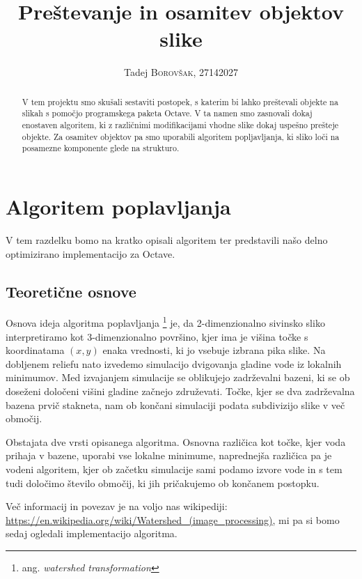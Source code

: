 \documentclass[a4paper, 11pt]{article}
\title{\huge{\textbf{Preštevanje in osamitev objektov slike}}}
\author{Tadej \textsc{Borovšak}, 27142027}
\begin{document}
\maketitle

\begin{abstract}
V tem projektu smo skušali sestaviti postopek, s katerim bi lahko preštevali objekte na slikah s pomočjo programskega paketa Octave. V ta namen smo zasnovali dokaj enostaven algoritem, ki z različnimi modifikacijami vhodne slike dokaj uspešno prešteje objekte. Za osamitev objektov pa smo uporabili algoritem popljavljanja, ki sliko loči na posamezne komponente glede na strukturo.
\end{abstract}

\tableofcontents


\section{Algoritem poplavljanja}

V tem razdelku bomo na kratko opisali algoritem ter predstavili našo delno optimizirano implementacijo za Octave.


\subsection{Teoretične osnove}

Osnova ideja algoritma poplavljanja \footnote{ang. \emph{watershed transformation}} je, da 2-dimenzionalno sivinsko sliko interpretiramo kot 3-dimenzionalno površino, kjer ima je višina točke s koordinatama $(x, y)$ enaka vrednosti, ki jo vsebuje izbrana pika slike. Na dobljenem reliefu nato izvedemo simulacijo dvigovanja gladine vode iz lokalnih minimumov. Med izvajanjem simulacije se oblikujejo zadrževalni bazeni, ki se ob doseženi določeni višini gladine začnejo združevati. Točke, kjer se dva zadrževalna bazena prvič stakneta, nam ob končani simulaciji podata subdivizijo slike v več območij.

Obstajata dve vrsti opisanega algoritma. Osnovna različica kot točke, kjer voda prihaja v bazene, uporabi vse lokalne minimume, naprednejša različica pa je vodeni algoritem, kjer ob začetku simulacije sami podamo izvore vode in s tem tudi določimo število območij, ki jih pričakujemo ob končanem postopku.

Več informacij in povezav je na voljo nas wikipediji: \url{https://en.wikipedia.org/wiki/Watershed_(image_processing)}, mi pa si bomo sedaj ogledali implementacijo algoritma.
\end{document}
